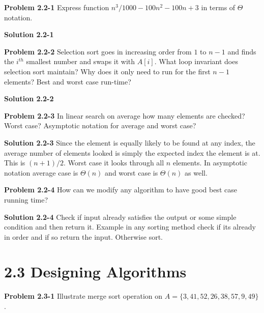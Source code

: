 \documentclass{article}
\begin{document}
\hrulefill

\medskip

\textbf{Problem 2.2-1} Express function $n^{3}/1000 - 100n^{2} - 100n + 3$ in terms of $\Theta$ notation.

\medskip

\textbf{Solution 2.2-1}

\hrulefill

\medskip

\textbf{Problem 2.2-2} Selection sort goes in increasing order from $1$ to $n - 1$ and finds the $i^{th}$ smallest number and swaps it with $A[i]$. What loop invariant does selection sort maintain? Why does it only need to run for the first $n - 1$ elements? Best and worst case run-time?

\medskip

\textbf{Solution 2.2-2}

\hrulefill

\medskip

\textbf{Problem 2.2-3} In linear search on average how many elements are checked? Worst case? Asymptotic notation for average and worst case?

\medskip

\textbf{Solution 2.2-3} Since the element is equally likely to be found at any index, the average number of elements looked is simply the expected index the element is at. This is $\boxed{(n+1)/2}$. Worst case it looks through all $\boxed{n}$ elements. In asymptotic notation average case is $\boxed{\Theta(n)}$ and worst case is $\boxed{\Theta(n)}$ as well.

\hrulefill

\medskip

\textbf{Problem 2.2-4} How can we modify any algorithm to have good best case running time?

\medskip

\textbf{Solution 2.2-4} Check if input already satisfies the output or some simple condition and then return it. Example in any sorting method check if its already in order and if so return the input. Otherwise sort.

\hrulefill

\section*{2.3 Designing Algorithms}

\hrulefill

\medskip

\textbf{Problem 2.3-1} Illustrate merge sort operation on $A = \{3, 41, 52, 26, 38, 57, 9, 49\}$.
\end{document}
